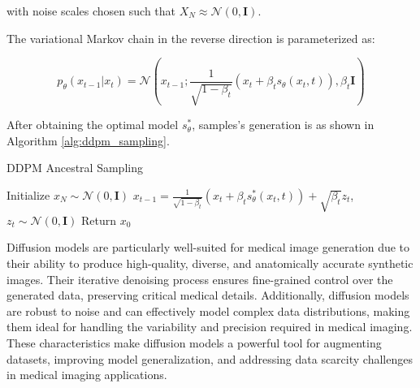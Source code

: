 \documentclass{article}
\begin{document}
with noise scales chosen such that $X_N \approx \mathcal{N}(0,\mathbf{I})$.

The variational Markov chain in the reverse direction is parameterized as:

\begin{equation}
p_\theta(x_{t-1}|x_t) = \mathcal{N}\left(x_{t-1}; \frac{1}{\sqrt{1-\beta_t}}(x_t + \beta_t s_\theta(x_t,t)), \beta_t\mathbf{I}\right)
\end{equation}



After obtaining the optimal model $s_\theta^*$, samples's generation is as shown in Algorithm \ref{alg:ddpm_sampling}. 

\begin{algorithm}[H]
\caption{DDPM Ancestral Sampling}
\label{alg:ddpm_sampling}
\begin{algorithmic}[1]
\STATE Initialize $x_N \sim \mathcal{N}(0,\mathbf{I})$
    \STATE $x_{t-1} = \frac{1}{\sqrt{1-\beta_t}}(x_t + \beta_t s_\theta^*(x_t,t)) + \sqrt{\beta_t}z_t$, $z_t \sim \mathcal{N}(0,\mathbf{I})$
\ENDFOR
\STATE Return $x_0$
\end{algorithmic}
\end{algorithm}

Diffusion models are particularly well-suited for medical image generation due to their ability to produce high-quality, diverse, and anatomically accurate synthetic images. Their iterative denoising process ensures fine-grained control over the generated data, preserving critical medical details. Additionally, diffusion models are robust to noise and can effectively model complex data distributions, making them ideal for handling the variability and precision required in medical imaging. These characteristics make diffusion models a powerful tool for augmenting datasets, improving model generalization, and addressing data scarcity challenges in medical imaging applications.



    
\end{document}
